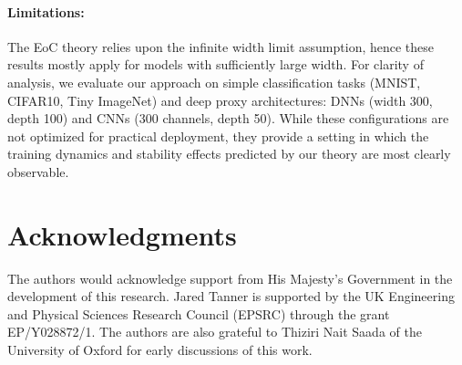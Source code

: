\documentclass{article}
\theoremstyle{plain}
\theoremstyle{definition}
\theoremstyle{remark}
\begin{document}
\paragraph{Limitations:}\label{limitations} The EoC theory relies upon the infinite width limit assumption, hence these results mostly apply for models with sufficiently large width. For clarity of analysis, we evaluate our approach on simple classification tasks (MNIST, CIFAR10, Tiny ImageNet) and deep proxy architectures: DNNs (width 300, depth 100) and CNNs (300 channels, depth 50). While these configurations are not optimized for practical deployment, they provide a setting in which the training dynamics and stability effects predicted by our theory are most clearly observable. 

\section*{Acknowledgments}
The authors would acknowledge support from His Majesty’s Government in the development of this research.
Jared Tanner is supported by the UK Engineering and Physical Sciences Research Council (EPSRC) through the grant EP/Y028872/1.
The authors are also grateful to Thiziri Nait Saada of the University of Oxford for early discussions of this work.





\end{document}

